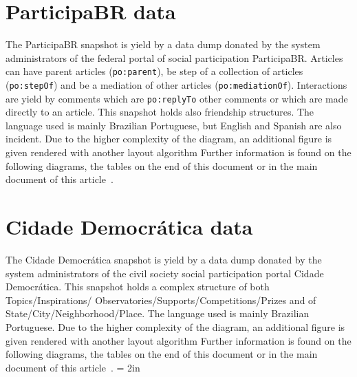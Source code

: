 \documentclass[review]{elsarticle}
\newcommand{\textttt}[1] {\texttt{\footnotesize#1}}
\begin{document}
\section{ParticipaBR data}
The ParticipaBR snapshot is yield by a data dump donated by the system
administrators of the federal portal of social participation ParticipaBR.
Articles can have parent articles (\textttt{po:parent}), be step of a
collection of articles (\textttt{po:stepOf}) and be a mediation of other
articles (\textttt{po:mediationOf}).
Interactions are yield by comments which are \textttt{po:replyTo} other
comments or which are made directly to an article.
This snapshot holds also friendship structures.
The language used is mainly Brazilian Portuguese, but English and
Spanish are also incident.
Due to the higher complexity of the diagram, an additional figure is
given rendered with another layout algorithm
Further information is found on the following diagrams, the tables on
the end of this document or in the main document of this
article~\cite{losd}.

\section{Cidade Democrática data}
The Cidade Democrática snapshot is yield by a data dump donated by the system
administrators of the civil society social participation portal Cidade
Democrática.
This snapshot holds a complex structure of both
Topics/Inspirations/
Observatories/Supports/Competitions/Prizes
and of State/City/Neighborhood/Place.
The language used is mainly Brazilian Portuguese.
Due to the higher complexity of the diagram, an additional figure is
given rendered with another layout algorithm
Further information is found on the following diagrams, the tables on
the end of this document or in the main document of this
article~\cite{losd}.
\textheight = 2in
\pdfpageheight 5in
\end{document}
